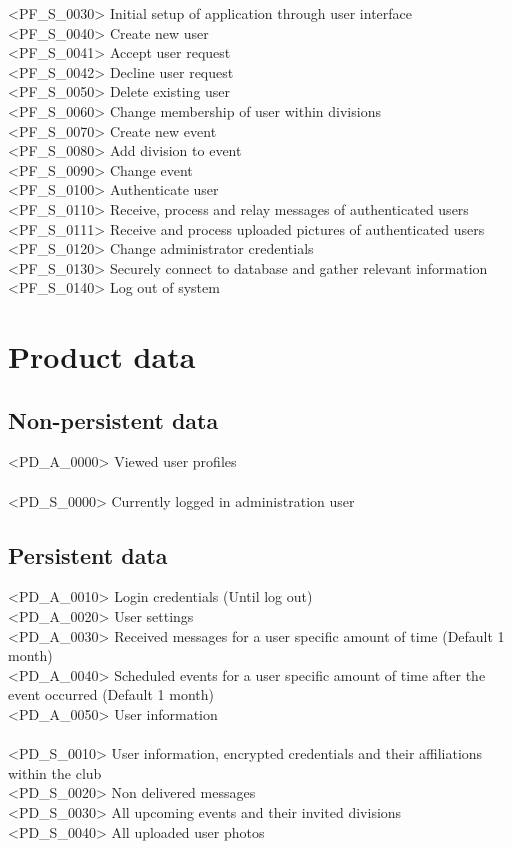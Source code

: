 <PF\_S\_0030> Initial setup of application through user interface \\
<PF\_S\_0040> Create new user \\
<PF\_S\_0041> Accept user request \\
<PF\_S\_0042> Decline user request \\
<PF\_S\_0050> Delete existing user \\
<PF\_S\_0060> Change membership of user within divisions \\
<PF\_S\_0070> Create new event \\
<PF\_S\_0080> Add division to event \\
<PF\_S\_0090> Change event \\
<PF\_S\_0100> Authenticate user \\
<PF\_S\_0110> Receive, process and relay messages of authenticated users \\
<PF\_S\_0111> Receive and process uploaded pictures of authenticated users \\
<PF\_S\_0120> Change administrator credentials \\
<PF\_S\_0130> Securely connect to database and gather relevant information \\
<PF\_S\_0140> Log out of system  \\

\chapter{Product data}
\section{Non-persistent data}
<PD\_A\_0000> Viewed user profiles \\
\\
<PD\_S\_0000> Currently logged in administration user \\


\section{Persistent data}
<PD\_A\_0010> Login credentials (Until log out) \\
<PD\_A\_0020> User settings \\
<PD\_A\_0030> Received messages for a user specific amount of time (Default 1 month) \\
<PD\_A\_0040> Scheduled events for a user specific amount of time after the event occurred (Default 1 month) \\
<PD\_A\_0050> User information \\
\\
<PD\_S\_0010> User information, encrypted credentials and their affiliations within the club \\
<PD\_S\_0020> Non delivered messages \\
<PD\_S\_0030> All upcoming events and their invited divisions \\
<PD\_S\_0040> All uploaded user photos \\

